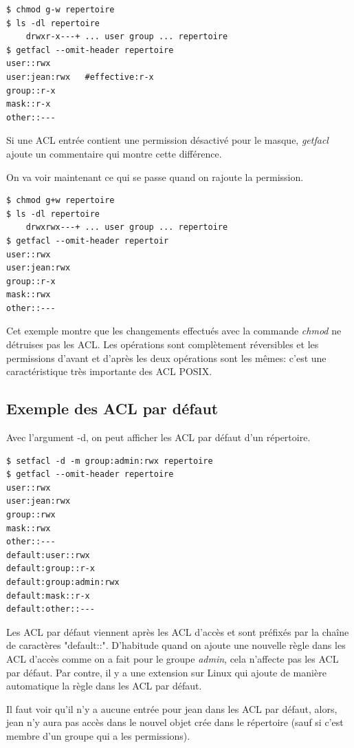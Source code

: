 \documentclass{article}
\begin{document}
\begin{verbatim}
$ chmod g-w repertoire 
$ ls -dl repertoire 
	drwxr-x---+ ... user group ... repertoire 
$ getfacl --omit-header repertoire 
user::rwx 
user:jean:rwx 	#effective:r-x
group::r-x 	
mask::r-x 
other::---

\end{verbatim}

Si une ACL entrée contient une permission désactivé pour le masque, \emph{getfacl} ajoute un commentaire qui montre cette différence.

On va voir maintenant ce qui se passe quand on rajoute la permission. 

\begin{verbatim}
$ chmod g+w repertoire 
$ ls -dl repertoire 
	drwxrwx---+ ... user group ... repertoire 
$ getfacl --omit-header repertoir 
user::rwx 
user:jean:rwx 
group::r-x
mask::rwx
other::---
\end{verbatim}

Cet exemple montre que les changements effectués avec la commande \emph{chmod} ne détruises pas les ACL. Les opérations sont complètement réversibles et les permissions d'avant et d'après les deux opérations sont les mêmes: c'est une caractéristique très importante des ACL POSIX. 

\subsection{Exemple des ACL par défaut}

Avec l'argument -d, on peut afficher les ACL par défaut d'un répertoire. 

\begin{verbatim}
$ setfacl -d -m group:admin:rwx repertoire 
$ getfacl --omit-header repertoire 
user::rwx
user:jean:rwx
group::rwx 
mask::rwx
other::---
default:user::rwx
default:group::r-x
default:group:admin:rwx
default:mask::r-x
default:other::---
\end{verbatim} 

Les ACL par défaut viennent après les ACL d'accès et sont préfixés par la chaîne de caractères "default::". D'habitude quand on ajoute une nouvelle règle dans les ACL d'accès comme on a fait pour le groupe \emph{admin}, cela n'affecte pas les ACL par défaut. Par contre, il y a une extension sur Linux qui ajoute de manière automatique la règle dans les ACL par défaut. 

Il faut voir qu'il n'y a aucune entrée pour jean dans les ACL par défaut, alors, jean n'y aura pas accès dans le nouvel objet crée dans le répertoire (sauf si c'est membre d'un groupe qui a les permissions). 
\end{document}
